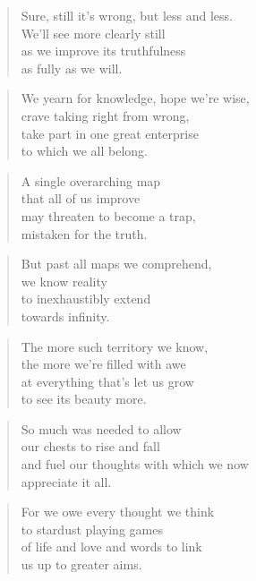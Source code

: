 \documentclass[14pt,a4paper]{article}
\begin{document}
\begin{verse}
Sure, still it’s wrong, but less and less.\\
We’ll see more clearly still\\
as we improve its truthfulness\\
as fully as we will.
\end{verse}

\begin{verse}
We yearn for knowledge, hope we’re wise,\\
crave taking right from wrong,\\
take part in one great enterprise\\
to which we all belong.
\end{verse}

\begin{verse}
A single overarching map\\
that all of us improve\\
may threaten to become a trap,\\
mistaken for the truth.
\end{verse}

\begin{verse}
But past all maps we comprehend,\\
we know reality\\
to inexhaustibly extend\\
towards infinity.
\end{verse}

\begin{verse}
The more such territory we know,\\
the more we’re filled with awe\\
at everything that’s let us grow\\
to see its beauty more.
\end{verse}

\begin{verse}
So much was needed to allow\\
our chests to rise and fall\\
and fuel our thoughts with which we now\\
appreciate it all.
\end{verse}

\begin{verse}
For we owe every thought we think\\
to stardust playing games\\
of life and love and words to link\\
us up to greater aims.
\end{verse}
\end{document}
